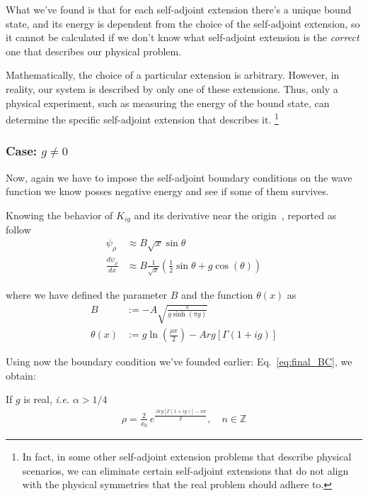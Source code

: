 \vspace{4mm}
\noindent
What we've found is that for each self-adjoint extension there's a unique bound state, and its energy is dependent from the choice of the self-adjoint extension, so it cannot be calculated if we don't know what self-adjoint extension is the \textit{correct} one that describes our physical problem. 

\vspace{4mm}
\noindent
Mathematically, the choice of a particular extension is arbitrary. However, in reality, our system is described by only one of these extensions. Thus, only a physical experiment, such as measuring the energy of the bound state, can determine the specific self-adjoint extension that describes it.
\footnote{In fact, in some other self-adjoint extension problems that describe physical scenarios, we can eliminate certain self-adjoint extensions that do not align with the physical symmetries that the real problem should adhere to.}

\subsubsection{Case: \(g \neq 0\)}

Now, again we have to impose the self-adjoint boundary conditions on the wave function we know posses negative energy and see if some of them survives.

Knowing the behavior of $K_{ig}$ and its derivative near the origin~\cite{garfken67:math}, reported as follow
\begin{align*}
    \psi_\rho             & \approx B \sqrt{x} \sin{\theta}                                                     \\
    \frac{d\psi_\rho}{dx} & \approx B \frac{1}{\sqrt{x}} \left(\frac{1}{2} \sin{\theta} + g \cos(\theta)\right)
\end{align*}

where we have defined the parameter $B$ and the function $\theta(x)$ as
\begin{align*}
    B         & := -A\sqrt{\frac{\pi}{g \sinh(\pi g)}}      \\
    \theta(x) & := g \ln{\left(\frac{\rho x}{2}\right)} - Arg[\Gamma(1+ig)]
\end{align*}

\clearpage

\noindent
Using now the boundary condition we've founded earlier: Eq.~\eqref{eq:final_BC}, we obtain:

\noindent
If $g$ is real, \textit{i.e. $\alpha > 1/4$}
\begin{align*}
    \rho = \frac{2}{x_0} \, e^{ \frac{Arg \left[\Gamma(1+ig)\right] - n \pi}{g}}, \quad n \in \mathbb{Z}
\end{align*}

